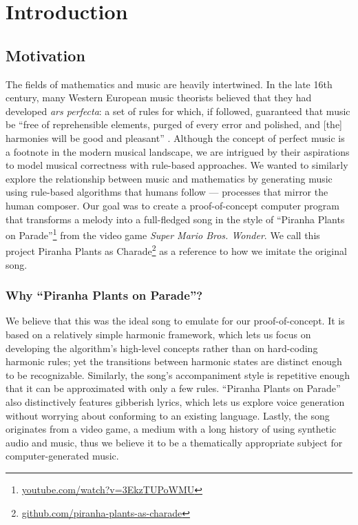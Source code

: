 \section{Introduction}

\subsection{Motivation}

The fields of mathematics and music are heavily intertwined. In the late 16th century, many Western European music theorists believed that they had developed \emph{ars perfecta}: a set of rules for which, if followed, guaranteed that music be ``free of reprehensible elements, purged of every error and polished, and [the] harmonies will be good and pleasant'' \autocite{Richard:2005}. Although the concept of perfect music is a footnote in the modern musical landscape, we are intrigued by their aspirations to model musical correctness with rule-based approaches. We wanted to similarly explore the relationship between music and mathematics by generating music using rule-based algorithms that humans follow --- processes that mirror the human composer. Our goal was to create a proof-of-concept computer program that transforms a melody into a full-fledged song in the style of ``Piranha Plants on Parade''\footnote{\href{https://www.youtube.com/watch?v=3EkzTUPoWMU}{youtube.com/watch?v=3EkzTUPoWMU}} from the video game \emph{Super Mario Bros. Wonder}. We call this project Piranha Plants as Charade\footnote{\href{https://github.com/piranha-plants-as-charade}{github.com/piranha-plants-as-charade}} as a reference to how we imitate the original song.

\subsubsection{Why ``Piranha Plants on Parade''?}

We believe that this was the ideal song to emulate for our proof-of-concept. It is based on a relatively simple harmonic framework, which lets us focus on developing the algorithm's high-level concepts rather than on hard-coding harmonic rules; yet the transitions between harmonic states are distinct enough to be recognizable. Similarly, the song's accompaniment style is repetitive enough that it can be approximated with only a few rules. ``Piranha Plants on Parade'' also distinctively features gibberish lyrics, which lets us explore voice generation without worrying about conforming to an existing language. Lastly, the song originates from a video game, a medium with a long history of using synthetic audio and music, thus we believe it to be a thematically appropriate subject for computer-generated music.

